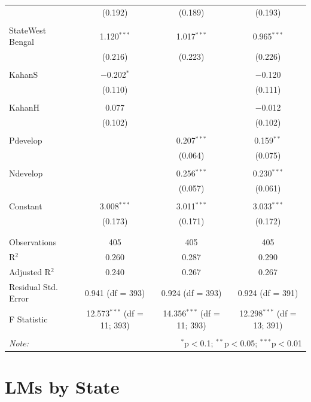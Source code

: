 \documentclass[
]{article}
\begin{document}
\begin{table}[!htbp]
\begin{tabular}{@{\extracolsep{5pt}}lccc}
  & (0.192) & (0.189) & (0.193) \\ 
  & & & \\ 
 StateWest Bengal & 1.120$^{***}$ & 1.017$^{***}$ & 0.965$^{***}$ \\ 
  & (0.216) & (0.223) & (0.226) \\ 
  & & & \\ 
 KahanS & $-$0.202$^{*}$ &  & $-$0.120 \\ 
  & (0.110) &  & (0.111) \\ 
  & & & \\ 
 KahanH & 0.077 &  & $-$0.012 \\ 
  & (0.102) &  & (0.102) \\ 
  & & & \\ 
 Pdevelop &  & 0.207$^{***}$ & 0.159$^{**}$ \\ 
  &  & (0.064) & (0.075) \\ 
  & & & \\ 
 Ndevelop &  & 0.256$^{***}$ & 0.230$^{***}$ \\ 
  &  & (0.057) & (0.061) \\ 
  & & & \\ 
 Constant & 3.008$^{***}$ & 3.011$^{***}$ & 3.033$^{***}$ \\ 
  & (0.173) & (0.171) & (0.172) \\ 
  & & & \\ 
\hline \\[-1.8ex] 
Observations & 405 & 405 & 405 \\ 
R$^{2}$ & 0.260 & 0.287 & 0.290 \\ 
Adjusted R$^{2}$ & 0.240 & 0.267 & 0.267 \\ 
Residual Std. Error & 0.941 (df = 393) & 0.924 (df = 393) & 0.924 (df = 391) \\ 
F Statistic & 12.573$^{***}$ (df = 11; 393) & 14.356$^{***}$ (df = 11; 393) & 12.298$^{***}$ (df = 13; 391) \\ 
\hline 
\hline \\[-1.8ex] 
\textit{Note:}  & \multicolumn{3}{r}{$^{*}$p$<$0.1; $^{**}$p$<$0.05; $^{***}$p$<$0.01} \\ 
\end{tabular} 
\end{table} 
\endgroup

\newpage

\hypertarget{lms-by-state}{%
\section{LMs by State}\label{lms-by-state}}
\end{document}
